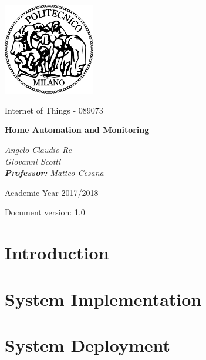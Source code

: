 \documentclass[a4paper,12pt]{report}
\begin{document}
\begin{titlepage}
\centering
\includegraphics[width=0.30\textwidth]{./pictures/logo_poli}\par
	\vspace{1.8cm}
	{\Large {Internet of Things - 089073} \par}
	\vspace{1.2cm}
	{\LARGE \textbf{Home Automation and Monitoring} \par}
	\vspace{2.5cm}
	\begin{flushright}
		{\Large\itshape{Angelo Claudio Re \\ Giovanni Scotti \\}
		\vspace{0.5cm} 
		\Large{\textbf{Professor:} Matteo Cesana}
	    \par}
	\end{flushright}
	\vspace{2cm}
	\vfill
	{\large Academic Year 2017/2018 \par}
	\vspace{0.3cm}
	{\large Document version: 1.0\par}
\end{titlepage}

\tableofcontents

\chapter{Introduction}
\label{ch:Introduction}


\chapter{System Implementation}
\label{ch:System Implementation}


\chapter{System Deployment}
\label{ch:System Deployment}

\end{document}

